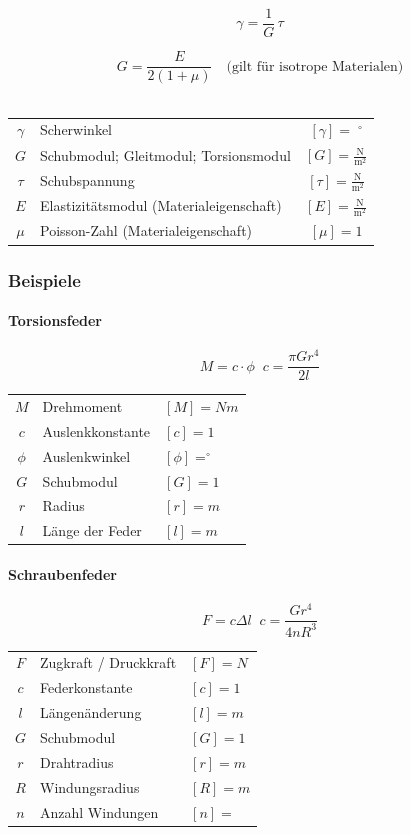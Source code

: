 		$$ \boxed{ \gamma = \frac{1}{G} \, \tau }$$ 
		
		$$ \boxed{ G = \frac{E}{2(1 + \mu)}  \quad \text{(gilt für isotrope Materialen)} } $$\\
		
		
		\begin{tabular}{c l c}
		$\gamma$ & Scherwinkel & $[\gamma] = \; ^\circ $ \\
		\rule{0pt}{10pt}$G$ & Schubmodul; Gleitmodul; Torsionsmodul & $[G] = \mathrm{\frac{N}{m^2}}$ \\
		\rule{0pt}{10pt}$\tau$ & Schubspannung & $[\tau] = \mathrm{\frac{N}{m^2}}$ \\
		\rule{0pt}{10pt}$E$ & Elastizitätsmodul (Materialeigenschaft) & $[E] = \mathrm{\frac{N}{m^2}}$ \\
		$\mu$ & Poisson-Zahl (Materialeigenschaft) & $[\mu] = 1$ \\
		\end{tabular}
		
	\subsubsection{Beispiele}

	\paragraph{Torsionsfeder}

	$$ \boxed{ M = c \cdot \phi } \; \; c = \frac{\pi Gr^4}{2l} $$

	\begin{tabular}{c l l}
	$M$ & Drehmoment & $[M] = Nm $ \\
	$c$ & Auslenkkonstante & $ [c] = 1 $ \\
	$ \phi $ & Auslenkwinkel & $ [ \phi ] = ^\circ $ \\
	$G$ & Schubmodul & $ [G] = 1 $ \\
	$r$ & Radius & $ [r] = m $ \\
	$l$ & Länge der Feder & $ [l] = m $ \\
	\end{tabular}

	\paragraph{Schraubenfeder}

	$$ \boxed{ F = c \Delta l } \; \; c = \frac{Gr^4}{4nR^3} $$

	\begin{tabular}{c l l}
	$F$ & Zugkraft / Druckkraft & $[F] = N $ \\
	$c$ & Federkonstante & $ [c] = 1 $ \\
	$l$ & Längenänderung & $ [l] = m $ \\
	$G$ & Schubmodul & $ [G] = 1 $ \\
	$r$ & Drahtradius & $ [r] = m $ \\
	$R$ & Windungsradius & $ [R] = m $\\
	$n$ & Anzahl Windungen & $ [n] = $ \\
	\end{tabular}		
		
